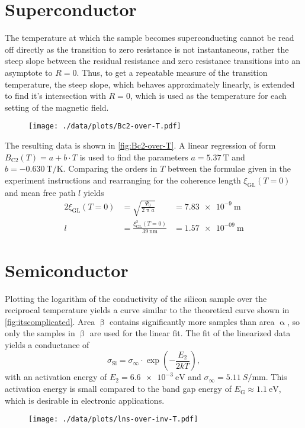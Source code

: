 \section{Superconductor}
The temperature at which the sample becomes superconducting cannot be read off directly as the transition to zero resistance is not instantaneous, rather the steep slope between the residual resistance and zero resistance transitions into an asymptote to $R = 0$.
Thus, to get a repeatable measure of the transition temperature, the steep slope, which behaves approximately linearly, is extended to find it's intersection with $R = 0$, which is used as the temperature for each setting of the magnetic field.
\begin{figure}
	\centering
	\texttt{[image: ./data/plots/Bc2-over-T.pdf]}
	\label{fig:Bc2-over-T}
\end{figure}

The resulting data is shown in \autoref{fig:Bc2-over-T}.
A linear regression of form $B_\text{C2}(T) = a + b \cdot T$ is used to find the parameters $a = \SI{5.37}{\tesla}$ and $b = \SI{-0.630}{\tesla\per\kelvin}$.
Comparing the orders in $T$ between the formulae given in the experiment instructions and rearranging for the coherence length $\xi_\text{GL}(T = 0)$ and mean free path $l$ yields
\begin{alignat*}{2}
	\xi_\text{GL}(T = 0) &= \sqrt{\frac{\Psi_0}{2 \uppi a}} &= \SI{7.83e-9}{\meter}\\
	l &= \frac{\xi^2_\text{GL}(T = 0)}{\SI{39}{\nano\meter}} &= \SI{1.57e-09}{\meter}
\end{alignat*}

\section{Semiconductor}
Plotting the logarithm of the conductivity of the silicon sample over the reciprocal temperature yields a curve similar to the theoretical curve shown in \autoref{fig:itscomplicated}.
Area $\upbeta$ contains significantly more samples than area $\upalpha$, so only the samples in $\upbeta$ are used for the linear fit.
The fit of the linearized data yields a conductance of
\begin{equation*}
	\sigma_\text{Si} = \sigma_\infty \cdot \exp\left(- \frac{E_2}{2 k T}\right),
\end{equation*}
with an activation energy of $E_2 = \SI{6.6e-3}{\eV}$ and $\sigma_\infty = \SI{5.11}{S\per\milli\meter}$.
This activation energy is small compared to the band gap energy of $E_\text{G} \approx \SI{1.1}{\eV}$, which is desirable in electronic applications.

\begin{figure}
	\centering
	\texttt{[image: ./data/plots/lns-over-inv-T.pdf]}
	\label{fig:lns-over-inv-T}
\end{figure}
